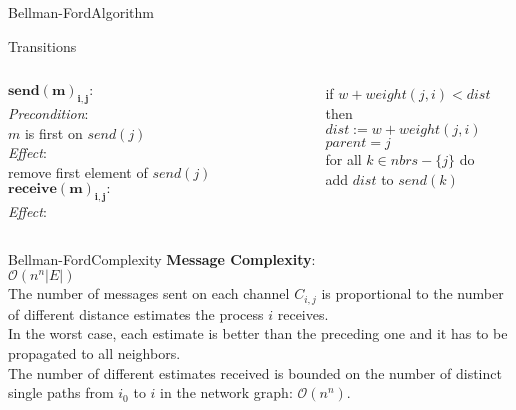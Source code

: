 \documentclass[pdf]{beamer}
\begin{document}
\begin{frame}{Bellman-Ford}{Algorithm}
    \begin{block}{Transitions}
        \vspace{2mm}
        \begin{columns}
            $\mathbf{send(m)_{i, j}:}$\\ 
            \emph{Precondition}: \\ 
            \small $m$ is first on $send(j)$ \\
            \normalsize \emph{Effect}: \\
            \small remove first element of $send(j)$
            \normalsize $\mathbf{receive(m)_{i, j}: }$ \\
            \emph{Effect}: \\
            \small
            \begin{tcolorbox}[colframe=red]
                if $w + weight(j, i) < dist$ then \\
                \hspace*{\parindent} $dist := w + weight(j, i)$ \\
                \hspace*{\parindent} $parent = j$ \\
                \hspace*{\parindent} for all $k \in nbrs - \{j\}$ do \\
                \hspace*{\parindent} \hspace*{\parindent} add $dist$ to $send(k)$ \\
            \end{tcolorbox}
        \end{columns}
    \end{block}
\end{frame}

\begin{frame}{Bellman-Ford}{Complexity}
	\textbf{Message Complexity}: \\
    \vspace{8pt}
    \pause
	$\mathcal{O}(n^n |E|)$ \\
    \vspace{8pt}
    \pause
    \small
    The number of messages sent on each channel $C_{i, j}$ is proportional to the number of different distance estimates the process $i$ receives. \\
    \vspace{8pt}
    \pause
    In the worst case, each estimate is better than the preceding one and it has to be propagated to all neighbors. \\
    \vspace{8pt}
    \pause 
    The number of different estimates received is bounded on the number of distinct single paths from $i_0$ to $i$ in the network graph: $\mathcal{O}(n^n)$.
\end{frame}
\end{document}
